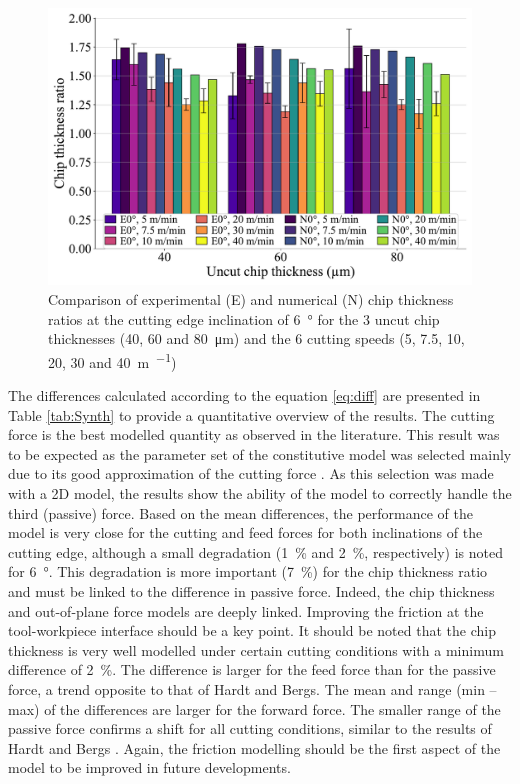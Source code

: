 \documentclass[preprint,12pt,times]{elsarticle}
\begin{document}
\begin{figure}[!h]
\centering
\includegraphics[width = 140 mm]{Figures/h6}
\caption{Comparison of experimental (E) and numerical (N) chip thickness ratios at the cutting edge inclination of \qty{6}{\degree} for the 3 uncut chip thicknesses (40, 60 and \qty{80}{\um}) and the 6 cutting speeds (5, 7.5, 10, 20, 30 and \qty{40}{\m\per\min})}
\label{fig:h6}
\end{figure}

The differences calculated according to the equation \ref{eq:diff} are presented in Table \ref{tab:Synth} to provide a quantitative overview of the results. The cutting force is the best modelled quantity as observed in the literature. This result was to be expected as the parameter set of the constitutive model was selected mainly due to its good approximation of the cutting force \cite{ducobu_Importance_2017}. As this selection was made with a 2D model, the results show the ability of the model to correctly handle the third (passive) force. Based on the mean differences, the performance of the model is very close for the cutting and feed forces for both inclinations of the cutting edge, although a small degradation (\qty{1}{\%} and \qty{2}{\%}, respectively) is noted for \qty{6}{\degree}. This degradation is more important (\qty{7}{\%}) for the chip thickness ratio and must be linked to the difference in passive force. Indeed, the chip thickness and out-of-plane force models are deeply linked. Improving the friction at the tool-workpiece interface should be a key point. It should be noted that the chip thickness is very well modelled under certain cutting conditions with a minimum difference of \qty{2}{\%}. The difference is larger for the feed force than for the passive force, a trend opposite to that of Hardt and Bergs. The mean and range (min -- max) of the differences are larger for the forward force. The smaller range of the passive force confirms a shift for all cutting conditions, similar to the results of Hardt and Bergs \cite{hardt_Three_2021}. Again, the friction modelling should be the first aspect of the model to be improved in future developments.
\end{document}
